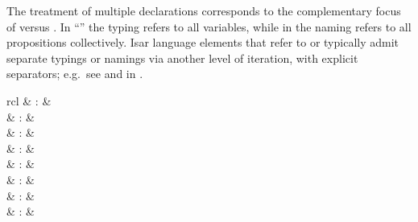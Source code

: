 \begin{isabellebody}
\begin{isamarkuptext}
  The treatment of multiple declarations corresponds to the
  complementary focus of  versus
  .  In ``''
  the typing refers to all variables, while in  the naming refers to all propositions collectively.
  Isar language elements that refer to  or
   typically admit separate typings or namings via
  another level of iteration, with explicit \hyperlink{keyword.and}{\mbox{}}
  separators; e.g.\ see \hyperlink{command.fix}{\mbox{}} and \hyperlink{command.assume}{\mbox{}} in
  .%
\end{isamarkuptext}%
\isamarkuptrue%
%
\isamarkuptrue%
%
\begin{isamarkuptext}%
\begin{matharray}{rcl}
    \hypertarget{antiquotation.theory}{\hyperlink{antiquotation.theory}{\mbox{}}} & : & \isarantiq \\
    \hypertarget{antiquotation.thm}{\hyperlink{antiquotation.thm}{\mbox{}}} & : & \isarantiq \\
    \hypertarget{antiquotation.prop}{\hyperlink{antiquotation.prop}{\mbox{}}} & : & \isarantiq \\
    \hypertarget{antiquotation.term}{\hyperlink{antiquotation.term}{\mbox{}}} & : & \isarantiq \\
    \hypertarget{antiquotation.const}{\hyperlink{antiquotation.const}{\mbox{}}} & : & \isarantiq \\
    \hypertarget{antiquotation.abbrev}{\hyperlink{antiquotation.abbrev}{\mbox{}}} & : & \isarantiq \\
    \hypertarget{antiquotation.typeof}{\hyperlink{antiquotation.typeof}{\mbox{}}} & : & \isarantiq \\
    \hypertarget{antiquotation.typ}{\hyperlink{antiquotation.typ}{\mbox{}}} & : & \isarantiq \\

\end{matharray}
\end{isamarkuptext}
\end{isabellebody}
